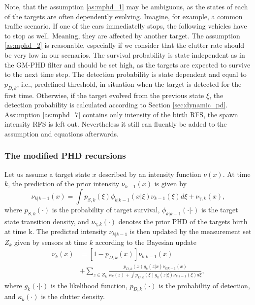 Note, that the assumption \ref{as:mphd_1} may be ambiguous, as the states of each of the targets are often
dependently
evolving.
Imagine,
for example, a common traffic scenario. If one of the cars immediatelly stops, the following vehicles have to stop as
well. Meaning, they are affected by another target.
The assumption \ref{as:mphd_2} is reasonable, especially if we consider that the clutter rate should be very low in
our
scenarios.
The survival probability is state independent as in the GM-PHD filter and should be set high, as the targets are
expected
to survive to the next time step.
The detection probability is state dependent and equal to $p_{D,k}$, i.e., predefined threshold, in situation when
the target is detected for the first time. Otherwise, if the target evolved from the previous state $\xi$, the
detection probability is calculated according to Section \ref{sec:dynamic_pd}.
Assumption \ref{as:mphd_7} contains only intensity of the birth RFS, the spawn intensity RFS is left out.
Nevertheless it still can fluently be added to the assumption
and equations afterwards.

\subsubsection{The modified PHD recursions}
Let us assume a target state $x$ described by an intensity function $\nu(x)$. At time $k$, the prediction of the prior
intensity $\nu_{k-1}(x)$ is given by
\begin{equation}
  \nu_{k|k-1}(x) = \int p_{S,k}(\xi)\phi_{k|k-1}(x|\xi)\nu_{k-1}(\xi)d\xi + \nu_{\gamma,k}(x), \label{eq:mphdPrior}
\end{equation}
where $p_{S,k}(\cdot)$ is the probability of target survival, $\phi_{k|k-1}(\cdot|\cdot)$ is the target state transition density, and $\nu_{\gamma,k}(\cdot)$ denotes the prior PHD of the targets birth at time k.
The predicted intensity $\nu_{k|k-1}$ is then updated by the measurement set $Z_k$ given by sensors at time $k$ according to the Bayesian update
\begin{equation}
  \begin{aligned}
    \nu_k(x) &= [1 - p_{D,k}(x)]\nu_{k|k-1}(x) \\
    &+ \sum_{z \in Z_k}\frac{p_{D,k}(x) g_k(z|x) \nu_{k|k-1}(x)}{\kappa_k(z) + \int p_{D,k}(\xi) g_k(z|\xi) \nu_{k|
    k-1}(\xi)d\xi}, \label{eq:mphdPosterior}
  \end{aligned}
\end{equation}
where $g_k(\cdot|\cdot)$ is the likelihood function, $p_{D,k}(\cdot)$ is the probability of detection, and $\kappa_k(\cdot)$ is the clutter density.

